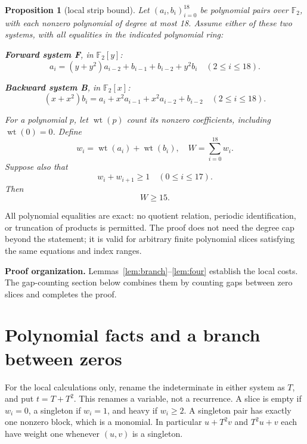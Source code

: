 \documentclass{article}
\newtheorem{proposition}{Proposition}
\DeclareMathOperator{\wt}{wt}
\newcommand{\Ftwo}{\mathbb{F}_2}
\begin{document}
\begin{proposition}[local strip bound]\label{prop:strip}
  Let \((a_i,b_i)_{i=0}^{18}\) be polynomial pairs over \(\Ftwo\), with
  each nonzero polynomial of degree at most 18. Assume either of these two
  systems, with all equalities in the indicated polynomial ring:

  \textbf{Forward system F}, in \(\Ftwo[y]\):
  \begin{equation}\label{eq:forward}
    a_i=(y+y^2)a_{i-2}+b_{i-1}+b_{i-2}+y^2b_i
    \quad (2\le i\le 18).
  \end{equation}

  \textbf{Backward system B}, in \(\Ftwo[x]\):
  \begin{equation}\label{eq:backward}
    (x+x^2)b_i=a_i+x^2a_{i-1}+x^2a_{i-2}+b_{i-2}
    \quad (2\le i\le 18).
  \end{equation}

  For a polynomial \(p\), let \(\wt(p)\) count its nonzero coefficients,
  including \(\wt(0)=0\). Define
  \begin{equation}
    w_i=\wt(a_i)+\wt(b_i), \quad W=\sum_{i=0}^{18}w_i.
  \end{equation}
  Suppose also that
  \begin{equation}\label{eq:adjacent}
    w_i+w_{i+1}\ge 1 \quad (0\le i\le 17).
  \end{equation}
  Then
  \begin{equation}\label{eq:main-bound}
    W\ge 15.
  \end{equation}
\end{proposition}

All polynomial equalities are exact: no quotient relation, periodic
identification, or truncation of products is permitted. The proof does not
need the degree cap beyond the statement; it is valid for arbitrary finite
polynomial slices satisfying the same equations and index ranges.

\textbf{Proof organization.} Lemmas~\ref{lem:branch}--\ref{lem:four} establish
the local costs. The gap-counting section below
combines them by counting gaps between zero slices and completes the proof.

\section{Polynomial facts and a branch between zeros}\label{sec:branch}

For the local calculations only, rename the indeterminate in either
system as \(T\), and put \(t=T+T^2\). This renames a variable, not a recurrence.
A slice is empty if \(w_i=0\), a singleton if \(w_i=1\), and heavy if
\(w_i\ge 2\). A singleton pair has exactly one nonzero block, which is a
monomial. In particular \(u+T^2v\) and \(T^2u+v\) each have weight one whenever
\((u,v)\) is a singleton.
\end{document}

